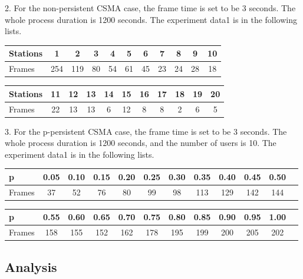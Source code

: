 \documentclass[11pt,a4paper]{report}
\begin{document}
2. For the non-persistent CSMA case, the frame time is set to be 3 seconds. The whole process duration is 1200 seconds. The experiment data1 is in the following lists. 
\begin{table}[htbp]
\begin{tabular}{lcccccccccc}
\toprule
Stations & 1 & 2 & 3 & 4 & 5 & 6 & 7 & 8 & 9 & 10 \\
\midrule
Frames & 254 & 119 & 80 & 54 & 61 & 45 & 23 & 24 & 28 & 18 \\
\bottomrule
\end{tabular}
\end{table}

\begin{table}[htbp]
\begin{tabular}{lcccccccccc}
\toprule
Stations & 11 & 12 & 13  & 14 & 15 & 16 & 17 & 18 & 19 & 20 \\
\midrule
Frames & 22 & 13 & 13 & 6 & 12 & 8 & 8 & 2 & 6 & 5 \\
\bottomrule
\end{tabular}
\end{table}

3. For the p-persistent CSMA case, the frame time is set to be 3 seconds. The whole process duration is 1200 seconds, and the number of users is 10. The experiment data1 is in the following lists.
\begin{table}[htbp]
\begin{tabular}{lccccccccccc}
\toprule
p & 0.05 & 0.10 & 0.15  & 0.20 & 0.25 & 0.30 & 0.35 & 0.40 & 0.45 & 0.50 \\
\midrule
Frames & 37 & 52 & 76 & 80 & 99 & 98 & 113 & 129 & 142 & 144 \\
\bottomrule
\end{tabular}
\end{table}

\begin{table}[htbp]
\begin{tabular}{lccccccccccc}
\toprule
p & 0.55 & 0.60 & 0.65  & 0.70 & 0.75 & 0.80 & 0.85 & 0.90 & 0.95 & 1.00 \\
\midrule
Frames & 158 & 155 & 152 & 162 & 178 & 195 & 199 & 200 & 205 & 202 \\
\bottomrule
\end{tabular}
\end{table}

\subsection*{Analysis}
\end{document}

